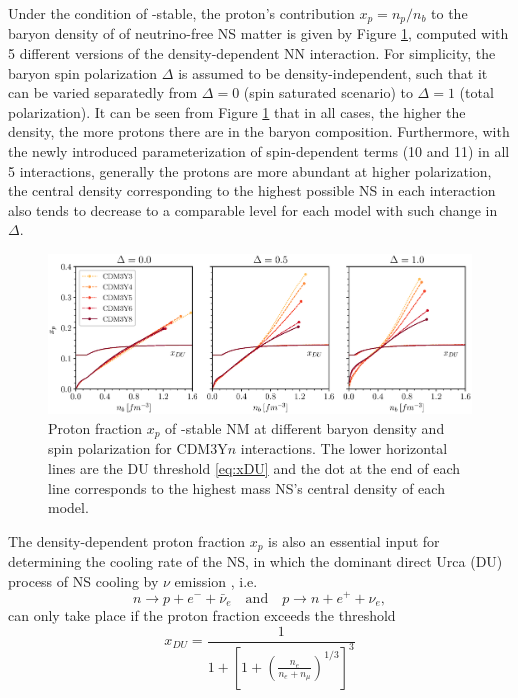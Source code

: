 Under the condition of \textbeta-stable, the proton's contribution $x_p = n_p/n_b$ to the baryon density of of neutrino-free \gls{NS} matter is given by Figure \ref{fig:xp}, computed with 5 different versions of the density-dependent \gls{NN} interaction. For simplicity, the baryon spin polarization $\Delta$ is assumed to be density-independent, such that it can be varied separatedly from $\Delta=0$ (spin saturated scenario) to $\Delta = 1$ (total polarization). It can be seen from Figure \ref{fig:xp} that in all cases, the higher the density, the more protons there are in the baryon composition. Furthermore, with the newly introduced parameterization of spin-dependent terms (10 and 11) in all 5 interactions, generally the protons are more abundant at higher polarization, the central density corresponding to the highest possible \gls{NS} in each interaction also tends to decrease to a comparable level for each model with such change in $\Delta$.
\begin{figure}[ht!]
        \centering
        \includegraphics[width=\textwidth]{fig/xp.eps}
        \caption{Proton fraction $x_p$ of \textbeta-stable \gls{NM} at different baryon density and spin polarization for CDM3Y$n$ interactions. The lower horizontal lines are the \gls{DU} threshold \eqref{eq:xDU} and the dot at the end of each line corresponds to the highest mass \gls{NS}'s central density of each model.}
        \label{fig:xp}
\end{figure} 
The density-dependent proton fraction $x_p$ is also an essential input for determining the cooling rate of the \gls{NS}, in which the dominant direct Urca (\gls{DU}) process of \gls{NS} cooling by $\nu$ emission \citep{lattimer2004physics}, i.e.
\begin{equation}
    n \longrightarrow p + e^- +\bar{\nu}_e \quad\text{and}\quad p \longrightarrow n + e^+ + \nu_e,
\end{equation}
can only take place if the proton fraction exceeds the threshold \citep{loan2011equation}
\begin{equation}
    x_{DU} = \frac{1}{ 1 + \left[ 1 + \left( \frac{n_e}{n_e + n_\mu} \right)^{1/3} \right]^3 }
    \label{eq:xDU}
\end{equation}
